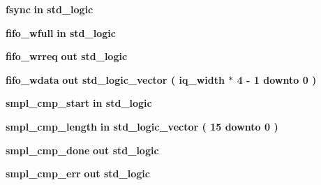 \begin{DoxyCompactItemize}
\item 
{\bf fsync}  {\bfseries {\bfseries \textcolor{keywordflow}{in}\textcolor{vhdlchar}{ }}} {\bfseries \textcolor{comment}{std\+\_\+logic}\textcolor{vhdlchar}{ }} 
\item 
{\bf fifo\+\_\+wfull}  {\bfseries {\bfseries \textcolor{keywordflow}{in}\textcolor{vhdlchar}{ }}} {\bfseries \textcolor{comment}{std\+\_\+logic}\textcolor{vhdlchar}{ }} 
\item 
{\bf fifo\+\_\+wrreq}  {\bfseries {\bfseries \textcolor{keywordflow}{out}\textcolor{vhdlchar}{ }}} {\bfseries \textcolor{comment}{std\+\_\+logic}\textcolor{vhdlchar}{ }} 
\item 
{\bf fifo\+\_\+wdata}  {\bfseries {\bfseries \textcolor{keywordflow}{out}\textcolor{vhdlchar}{ }}} {\bfseries \textcolor{comment}{std\+\_\+logic\+\_\+vector}\textcolor{vhdlchar}{ }\textcolor{vhdlchar}{(}\textcolor{vhdlchar}{ }\textcolor{vhdlchar}{ }\textcolor{vhdlchar}{ }\textcolor{vhdlchar}{ }{\bfseries {\bf iq\+\_\+width}} \textcolor{vhdlchar}{$\ast$}\textcolor{vhdlchar}{ } \textcolor{vhdldigit}{4} \textcolor{vhdlchar}{-\/}\textcolor{vhdlchar}{ } \textcolor{vhdldigit}{1} \textcolor{vhdlchar}{ }\textcolor{keywordflow}{downto}\textcolor{vhdlchar}{ }\textcolor{vhdlchar}{ } \textcolor{vhdldigit}{0} \textcolor{vhdlchar}{ }\textcolor{vhdlchar}{)}\textcolor{vhdlchar}{ }} 
\item 
{\bf smpl\+\_\+cmp\+\_\+start}  {\bfseries {\bfseries \textcolor{keywordflow}{in}\textcolor{vhdlchar}{ }}} {\bfseries \textcolor{comment}{std\+\_\+logic}\textcolor{vhdlchar}{ }} 
\item 
{\bf smpl\+\_\+cmp\+\_\+length}  {\bfseries {\bfseries \textcolor{keywordflow}{in}\textcolor{vhdlchar}{ }}} {\bfseries \textcolor{comment}{std\+\_\+logic\+\_\+vector}\textcolor{vhdlchar}{ }\textcolor{vhdlchar}{(}\textcolor{vhdlchar}{ }\textcolor{vhdlchar}{ } \textcolor{vhdldigit}{15} \textcolor{vhdlchar}{ }\textcolor{keywordflow}{downto}\textcolor{vhdlchar}{ }\textcolor{vhdlchar}{ } \textcolor{vhdldigit}{0} \textcolor{vhdlchar}{ }\textcolor{vhdlchar}{)}\textcolor{vhdlchar}{ }} 
\item 
{\bf smpl\+\_\+cmp\+\_\+done}  {\bfseries {\bfseries \textcolor{keywordflow}{out}\textcolor{vhdlchar}{ }}} {\bfseries \textcolor{comment}{std\+\_\+logic}\textcolor{vhdlchar}{ }} 
\item 
{\bf smpl\+\_\+cmp\+\_\+err}  {\bfseries {\bfseries \textcolor{keywordflow}{out}\textcolor{vhdlchar}{ }}} {\bfseries \textcolor{comment}{std\+\_\+logic}\textcolor{vhdlchar}{ }} 
\end{DoxyCompactItemize}


